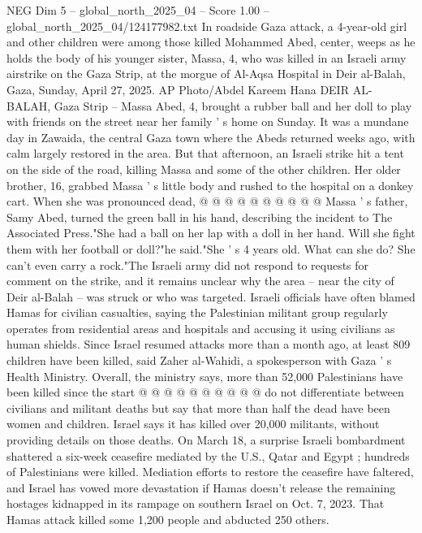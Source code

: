 \begin{textsample}{NEG Dim 5 – global\_north\_2025\_04 – Score 1.00 – global\_north\_2025\_04/124177982.txt}  \label{ex:f5_neg_365}
In roadside Gaza attack, a 4-year-old girl and other children were among those killed Mohammed Abed, center, weeps as he holds the body of his younger sister, Massa, 4, who was killed in an Israeli army airstrike on the Gaza Strip, at the morgue of Al-Aqsa Hospital in Deir al-Balah, Gaza, Sunday, April 27, 2025.
AP Photo/Abdel Kareem Hana DEIR AL-BALAH, Gaza Strip -- Massa Abed, 4, brought a rubber ball and her doll to play with friends on the street near her family ' s home on Sunday.
It was a mundane day in Zawaida, the central Gaza town where the Abeds returned weeks ago, with calm largely restored in the area.
But that afternoon, an Israeli strike hit a tent on the side of the road, killing Massa and some of the other children.
Her older brother, 16, grabbed Massa ' s little body and rushed to the hospital on a donkey cart.
When she was pronounced dead, @ @ @ @ @ @ @ @ @ @ Massa ' s father, Samy Abed, turned the green ball in his hand, describing the incident to The Associated Press."She had a ball on her lap with a doll in her hand.
Will she fight them with her football or doll?"he said."She ' s 4 years old.
What can she do?
She can't even carry a rock."The Israeli army did not respond to requests for comment on the strike, and it remains unclear why the area -- near the city of Deir al-Balah -- was struck or who was targeted.
Israeli officials have often blamed Hamas for civilian casualties, saying the Palestinian militant group regularly operates from residential areas and hospitals and accusing it using civilians as human shields.
Since Israel resumed attacks more than a month ago, at least 809 children have been killed, said Zaher al-Wahidi, a spokesperson with Gaza ' s Health Ministry.
Overall, the ministry says, more than 52,000 Palestinians have been killed since the start @ @ @ @ @ @ @ @ @ @ do not differentiate between civilians and militant deaths but say that more than half the dead have been women and children.
Israel says it has killed over 20,000 militants, without providing details on those deaths.
On March 18, a surprise Israeli bombardment shattered a six-week ceasefire mediated by the U.S., Qatar and Egypt ; hundreds of Palestinians were killed.
Mediation efforts to restore the ceasefire have faltered, and Israel has vowed more devastation if Hamas doesn't release the remaining hostages kidnapped in its rampage on southern Israel on Oct. 7, 2023.
That Hamas attack killed some 1,200 people and abducted 250 others.

\end{textsample}
